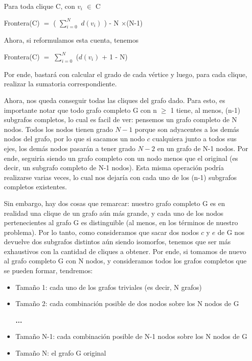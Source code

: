 \begin{center}
Para toda clique C, con ${v_i}$ $\in$ C

Frontera(C) $=$ ( $\sum_{i=0}^{N}$ ${d(v_i)}$ ) - N $\times$(N-1)
\end{center}

Ahora, si reformulamos esta cuenta, tenemos 
\begin{center}
Frontera(C) $=$ $\sum_{i=0}^{N}$ (${d(v_i)}$ + 1 - N)
\end{center}

Por ende, bastará con calcular el grado de cada vértice y luego, para cada clique, realizar la sumatoria correspondiente.

Ahora, nos queda conseguir todas las cliques del grafo dado. Para esto, es importante notar que todo grafo completo G con n $\geq$ 1 tiene, al menos, (n-1) subgrafos completos, lo cual es facil de ver: pensemos un grafo completo de N nodos. Todos los nodos tienen grado ${N-1}$ porque son adyacentes a los demás nodos del grafo, por lo que si sacamos un nodo ${c}$ cualquiera junto a todos sus ejes, los demás nodos pasarán a tener grado ${N-2}$ en un grafo de N-1 nodos. Por ende, seguiría siendo un grafo completo con un nodo menos que el original (es decir, un subgrafo completo de N-1 nodos). Esta misma operación podría realizarse varias veces, lo cual nos dejaría con cada uno de los (n-1) subgrafos completos existentes.

Sin embargo, hay dos cosas que remarcar: nuestro grafo completo G es en realidad una clique de un grafo aún más grande, y cada uno de los nodos pertenecientes al grafo G es distinguible (al menos, en los términos de nuestro problema). Por lo tanto, como consideramos que sacar dos nodos ${c}$ y ${e}$ de G nos devuelve dos subgrafos distintos aún siendo isomorfos, tenemos que ser más exhaustivos con la cantidad de cliques a obtener. Por ende, si tomamos de nuevo al grafo completo G con N nodos, y consideramos todos los grafos completos que se pueden formar, tendremos:

\begin{itemize}
	\item Tamaño 1: cada uno de los grafos triviales (es decir, N grafos)
	
	\item Tamaño 2: cada combinación posible de dos nodos sobre los N nodos de G
	
	\textbf{...}
	
	\item Tamaño N-1: cada combinación posible de N-1 nodos sobre los N nodos de G
	
	\item Tamaño N: el grafo G original
\end{itemize}

